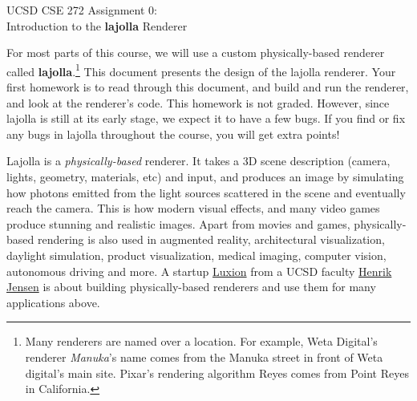 \documentclass{article}
\newcommand\header[2]{
    \begin{center}
        {\large
        UCSD CSE 272 Assignment #1: \\
        \vspace{0.3cm}
        \Large
        #2}
    \end{center}
}
\begin{document}
\header{0}{Introduction to the \textbf{lajolla} Renderer}

For most parts of this course, we will use a custom physically-based renderer called \textbf{lajolla}.\footnote{Many renderers are named over a location. For example, Weta Digital's renderer \emph{Manuka}'s name comes from the Manuka street in front of Weta digital's main site. Pixar's rendering algorithm Reyes comes from Point Reyes in California.} This document presents the design of the lajolla renderer. Your first homework is to read through this document, and build and run the renderer, and look at the renderer's code. This homework is not graded. However, since lajolla is still at its early stage, we expect it to have a few bugs. If you find or fix any bugs in lajolla throughout the course, you will get extra points!

Lajolla is a \emph{physically-based} renderer. It takes a 3D scene description (camera, lights, geometry, materials, etc) and input, and produces an image by simulating how photons emitted from the light sources scattered in the scene and eventually reach the camera. This is how modern visual effects, and many video games produce stunning and realistic images. Apart from movies and games, physically-based rendering is also used in augmented reality, architectural visualization, daylight simulation, product visualization, medical imaging, computer vision, autonomous driving and more. A startup \href{https://www.luxion.com/}{Luxion} from a UCSD faculty \href{http://graphics.ucsd.edu/~henrik/}{Henrik Jensen} is about building physically-based renderers and use them for many applications above.
\end{document}
